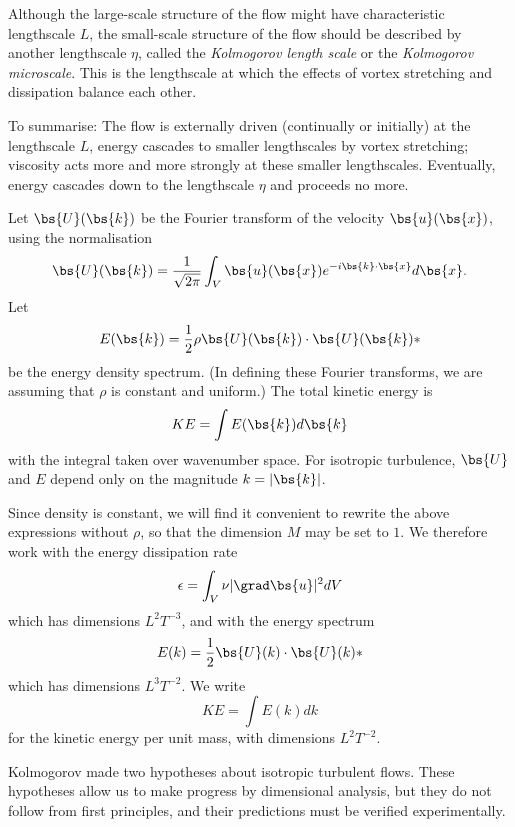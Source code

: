 Although the large-scale structure of the flow might have characteristic
lengthscale $L$, the small-scale structure of the flow should be described by
another lengthscale $\eta$, called the \textit{Kolmogorov length scale} or the
\textit{Kolmogorov microscale}. This is the lengthscale at which the effects of
vortex stretching and dissipation balance each other.

To summarise: The flow is externally driven (continually or initially) at the
lengthscale $L$, energy cascades to smaller lengthscales by vortex stretching;
viscosity acts more and more strongly at these smaller lengthscales. Eventually,
energy cascades down to the lengthscale $\eta$ and proceeds no more.

Let $\bs{U}(\bs{k})$ be the Fourier transform of the velocity $\bs{u}(\bs{x})$, using the normalisation
\begin{equation}
    \bs{U}(\bs{k}) = \frac{1}{\sqrt{2\pi}} \int_V \bs{u}(\bs{x}) e^{-i\bs{k}\cdot\bs{x}} d\bs{x}.
\end{equation}
Let 
\begin{equation}
    E(\bs{k}) = \frac{1}{2}\rho\bs{U}(\bs{k})\cdot\bs{U}(\bs{k})*
\end{equation}
be the energy density spectrum. (In defining these Fourier transforms, we are assuming that $\rho$ is constant and uniform.) The total kinetic energy is
\begin{equation}
    KE = \int E(\bs{k}) d\bs{k}
\end{equation}
with the integral taken over wavenumber space. For isotropic turbulence, $\bs{U}$ and $E$ depend only on the magnitude $k=|\bs{k}|$. 

Since density is constant, we will find it convenient to rewrite the above expressions without $\rho$, so that the dimension $M$ may be set to $1$. We therefore work with the energy dissipation rate 
\begin{equation}
    \epsilon = \int_V\nu|\grad\bs{u}|^2dV
\end{equation}
which has dimensions $L^2 T^{-3}$, and with the energy spectrum
\begin{equation}
    E(k) = \frac{1}{2}\bs{U}(k)\cdot\bs{U}(k)*
\end{equation}
which has dimensions $L^3 T^{-2}$. We write 
\begin{equation}
    KE = \int E(k) dk
\end{equation}
for the kinetic energy per unit mass, with dimensions $L^2 T^{-2}$.

Kolmogorov made two hypotheses about isotropic turbulent flows. These hypotheses allow us to make progress by dimensional analysis, but they do not follow from first principles, and their predictions must be verified experimentally.

